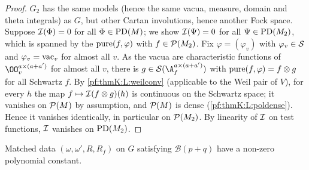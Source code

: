 \begin{proof}
$G_2$ has the same models (hence the same vacua, measure, domain and theta integrals) as $G$, but other Cartan involutions,
hence another Fock space. Suppose $\mathcal{I}(\Phi)=0$ for all $\Phi\in\operatorname{PD}(M)$; we show $\mathcal{I}(\Psi)=0$ for all
$\Psi\in\operatorname{PD}(M_2)$, which is spanned by the $\operatorname{pure}(f,\varphi)$ with $f\in\mathcal{P}(M_2)$. Fix $\varphi=(\varphi_v)$
with $\varphi_v\in\mathcal{S}$ and $\varphi_v=\mathrm{vac}_v$ for almost all $v$. As the vacua are characteristic functions of
$\OO_v^{a\times(a+a')}$ for almost all $v$, there is $g\in\thmKS(\A_f^{a\times(a+a')})$ with $\operatorname{pure}(f,\varphi)=f\otimes g$
for all Schwartz $f$. By \ref{pf:thmK:L:weilconv} (applicable to the Weil pair of $V$), for every $h$ the map
$f\mapsto\mathcal{I}(f\otimes g)(h)$ is continuous on the Schwartz space; it vanishes on $\mathcal{P}(M)$ by assumption, and
$\mathcal{P}(M)$ is dense (\ref{pf:thmK:L:poldense}). Hence it vanishes identically, in particular on $\mathcal{P}(M_2)$. By
linearity of $\mathcal{I}$ on test functions, $\mathcal{I}$ vanishes on $\operatorname{PD}(M_2)$.
\end{proof}

\begin{proposition}\label{pf:thmK:constof}
Matched data $(\omega,\omega',R,R_f)$ on $G$ satisfying $\mathcal B(p+q)$ have a non-zero polynomial constant.
\end{proposition}

